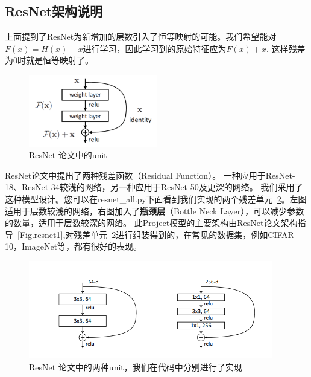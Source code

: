 \documentclass{article}
\theoremstyle{definition}
\begin{document}
\subsection{ResNet架构说明}
上面提到了ResNet为新增加的层数引入了恒等映射的可能。我们希望能对$F(x) = H(x) - x$进行学习，因此学习到的原始特征应为$F(x) + x$. 这样残差为0时就是恒等映射了。\\
\begin{figure}[h] %
	\centering %
	\includegraphics[width=0.5\textwidth]{resnetUnit.png} %
	\caption{ResNet 论文中的unit} %
	\label{Fig.resnet2} %
\end{figure}
\indent
ResNet论文中提出了两种残差函数（Residual Function）。 一种应用于ResNet-18、ResNet-34较浅的网络，另一种应用于ResNet-50及更深的网络。 我们采用了这种模型设计。您可以在resnet\_all.py下面看到我们实现的两个残差单元~\ref{Fig.resnet4}。左图适用于层数较浅的网络，右图加入了\textbf{瓶颈层}（Bottle Neck Layer），可以减少参数的数量，适用于层数较深的网络。
此Project模型的主要架构由ResNet论文架构指导~\ref{Fig.resnet1},对残差单元~\ref{Fig.resnet4}进行组装得到的，在常见的数据集，例如CIFAR-10，ImageNet等，都有很好的表现。\\
\begin{figure}[h] %
	\centering %
	\includegraphics[width=0.95\textwidth]{resnet2units.png} %
	\caption{ResNet 论文中的两种unit，我们在代码中分别进行了实现} %
	\label{Fig.resnet4} %
\end{figure}
\end{document}
